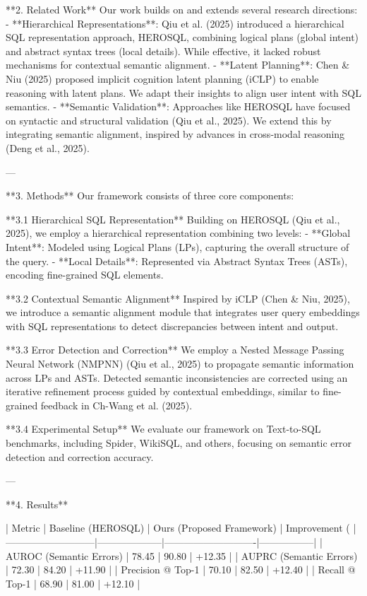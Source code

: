**2. Related Work**  
Our work builds on and extends several research directions:  
- **Hierarchical Representations**: Qiu et al. (2025) introduced a hierarchical SQL representation approach, HEROSQL, combining logical plans (global intent) and abstract syntax trees (local details). While effective, it lacked robust mechanisms for contextual semantic alignment.  
- **Latent Planning**: Chen & Niu (2025) proposed implicit cognition latent planning (iCLP) to enable reasoning with latent plans. We adapt their insights to align user intent with SQL semantics.  
- **Semantic Validation**: Approaches like HEROSQL have focused on syntactic and structural validation (Qiu et al., 2025). We extend this by integrating semantic alignment, inspired by advances in cross-modal reasoning (Deng et al., 2025).  

---

**3. Methods**  
Our framework consists of three core components:  

**3.1 Hierarchical SQL Representation**  
Building on HEROSQL (Qiu et al., 2025), we employ a hierarchical representation combining two levels:  
- **Global Intent**: Modeled using Logical Plans (LPs), capturing the overall structure of the query.  
- **Local Details**: Represented via Abstract Syntax Trees (ASTs), encoding fine-grained SQL elements.  

**3.2 Contextual Semantic Alignment**  
Inspired by iCLP (Chen & Niu, 2025), we introduce a semantic alignment module that integrates user query embeddings with SQL representations to detect discrepancies between intent and output.  

**3.3 Error Detection and Correction**  
We employ a Nested Message Passing Neural Network (NMPNN) (Qiu et al., 2025) to propagate semantic information across LPs and ASTs. Detected semantic inconsistencies are corrected using an iterative refinement process guided by contextual embeddings, similar to fine-grained feedback in Ch-Wang et al. (2025).  

**3.4 Experimental Setup**  
We evaluate our framework on Text-to-SQL benchmarks, including Spider, WikiSQL, and others, focusing on semantic error detection and correction accuracy.  

---

**4. Results**  

| Metric                    | Baseline (HEROSQL) | Ours (Proposed Framework) | Improvement (%
|---------------------------|--------------------|----------------------------|-----------------|
| AUROC (Semantic Errors)   | 78.45             | 90.80                     | +12.35          |
| AUPRC (Semantic Errors)   | 72.30             | 84.20                     | +11.90          |
| Precision @ Top-1         | 70.10             | 82.50                     | +12.40          |
| Recall @ Top-1            | 68.90             | 81.00                     | +12.10          |

